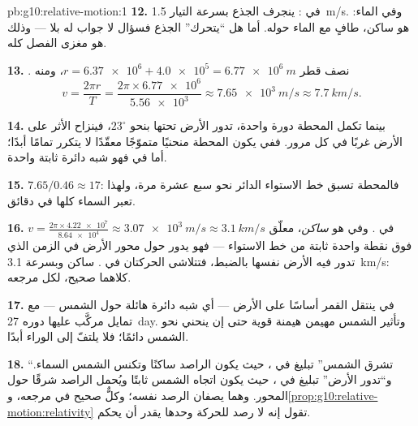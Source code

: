 \begin{solution}{pb:g10:relative-motion:1}
\textbf{12.} في : ينجرف الجذع بسرعة التيار
\qty{1.5}{m/s}. وفي  الماء: هو ساكن، طافٍ مع الماء
حوله. أما هل ``يتحرك'' الجذع فسؤال لا جواب له بلا  --- وذلك
هو مغزى الفصل كله.

\textbf{13.} . نصف قطر 
$r = \num{6.37e6} + \num{4.0e5} = \qty{6.77e6}{m}$، ومنه
\[
v = \frac{2\pi r}{T} = \frac{2\pi \times \num{6.77e6}}{\num{5.56e3}}
\approx \qty{7.65e3}{m/s} \approx \qty{7.7}{km/s}.
\]

\textbf{14.} بينما تكمل المحطة دورة واحدة، تدور الأرض
تحتها بنحو $23^\circ$، فينزاح الأثر على الأرض
غربًا في كل مرور. ففي  يكون  المحطة
منحنيًا متموّجًا معقّدًا لا يتكرر تمامًا أبدًا؛ أما في  فهو شبه دائرة ثابتة واحدة.

\textbf{15.} $7.65 / 0.46 \approx 17$: فالمحطة تسبق خط الاستواء
الدائر نحو سبع عشرة مرة، ولهذا تعبر السماء كلها في
دقائق.

\textbf{16.} $v = \frac{2\pi \times \num{4.22e7}}{\num{8.64e4}}
\approx \qty{3.07e3}{m/s} \approx \qty{3.1}{km/s}$ في . وفي  هو \emph{ساكن}، معلّق فوق نقطة واحدة
ثابتة من خط الاستواء --- فهو يدور حول محور الأرض في الزمن الذي
تدور فيه الأرض نفسها بالضبط، فتتلاشى الحركتان في . ساكن وبسرعة \qty{3.1}{km/s}: كلاهما صحيح، لكل مرجعه.

\textbf{17.} في  ينتقل القمر أساسًا
على  الأرض --- أي شبه دائرة هائلة حول الشمس ---
مع تمايل  مركَّب عليها دوره \qty{27}{day}. وتأثير الشمس
مهيمن هيمنة قوية حتى إن  ينحني نحو
الشمس دائمًا؛ فلا يلتفّ إلى الوراء أبدًا.

\textbf{18.} ``تشرق الشمس'' تبليغ في ، حيث
يكون الراصد ساكنًا وتكنس الشمس السماء. و``تدور الأرض''
تبليغ في ، حيث يكون اتجاه الشمس
ثابتًا ويُحمل الراصد شرقًا حول
المحور. وهما يصفان الرصد نفسه؛ وكلٌّ صحيح في مرجعه،
و\cref{prop:g10:relative-motion:relativity} تقول إنه لا رصد
للحركة وحدها يقدر أن يحكم.


\end{solution}
